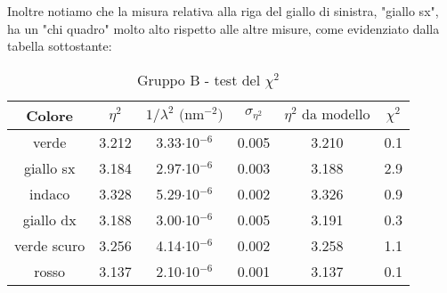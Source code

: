 Inoltre notiamo che la misura relativa alla riga del giallo di sinistra, "giallo sx", ha un "chi quadro" molto alto rispetto alle altre misure, come evidenziato dalla tabella sottostante:
\begin{table}[!htbp]
    {\par\centering
    \begin{tabular}{cccccc}
        \hline
            Colore &
            $\eta^2$ &
            $1/\lambda^2 \text{ (nm$^{-2}$)}$ &
            $\sigma_{\eta^2}$ &
            $\eta^2 \text{ da modello}$ &
            $\chi^2$\\
        \hline
        verde       &   3.212   &   3.33$\cdot$10$^{-6}$  & 0.005   &   3.210   &   0.1\\
        giallo sx   &   3.184   &   2.97$\cdot$10$^{-6}$  & 0.003   &   3.188   &   2.9\\
        indaco      &   3.328   &   5.29$\cdot$10$^{-6}$  & 0.002   &   3.326   &   0.9\\
        giallo dx   &   3.188   &   3.00$\cdot$10$^{-6}$  & 0.005   &   3.191   &   0.3\\
        verde scuro &   3.256   &   4.14$\cdot$10$^{-6}$  & 0.002   &   3.258   &   1.1\\
        rosso       &   3.137   &   2.10$\cdot$10$^{-6}$  & 0.001   &   3.137   &   0.1\\
        \hline
    \end{tabular}
    \par}
    \caption{Gruppo B - test del $\chi^2$}
\end{table}

